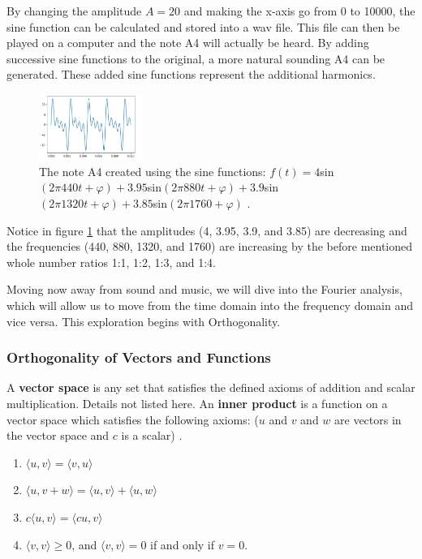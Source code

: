 \documentclass[10pt]{article}
\begin{document}
By changing the amplitude $A = 20$ and making the x-axis go from 0 to 10000, the sine function can be calculated and stored into a wav file. This file can then be played on a computer and the note A4 will actually be heard. By adding successive sine functions to the original, a more natural sounding A4 can be generated. These added sine functions represent the additional harmonics.

\begin{figure}[h]
    \centering
    \includegraphics[width=0.3\textwidth]{A4with4harmonics.jpg}
    \caption{The note A4 created using the sine functions: $f(t)=4$sin$(2\pi440t+\varphi) + 3.95$sin$(2\pi880t+\varphi) + 3.9$sin$(2\pi1320t+\varphi) + 3.85$sin$(2\pi1760+\varphi)$ .} 
    \label{fig:sine python 2}
\end{figure}

Notice in figure \ref{fig:sine python 2} that the amplitudes (4, 3.95, 3.9, and 3.85) are decreasing and the frequencies (440, 880, 1320, and 1760) are increasing by the before mentioned whole number ratios 1:1, 1:2, 1:3, and 1:4.

Moving now away from sound and music, we will dive into the Fourier analysis, which will allow us to move from the time domain into the frequency domain and vice versa. This exploration begins with Orthogonality.


\subsubsection{Orthogonality of Vectors and Functions}
\hspace{\parindent} A \textbf{vector space} is any set that satisfies the defined axioms of addition and scalar multiplication. Details not listed here. An \textbf{inner product} is a function on a vector space which satisfies the following axioms: ($u$ and $v$ and $w$ are vectors in the vector space and $c$ is a scalar) \cite{shields1968linearalgebra}.
\begin{enumerate}
    \item $\langle u, v \rangle = \langle v, u \rangle$
    \item $\langle u, v + w \rangle = \langle u, v \rangle + \langle u, w \rangle$
    \item $c \langle u, v \rangle = \langle cu, v \rangle$
    \item $\langle v, v \rangle \geq 0$, and $\langle v, v \rangle = 0$ if and only if $v = 0.$
\end{enumerate}
\end{document}
